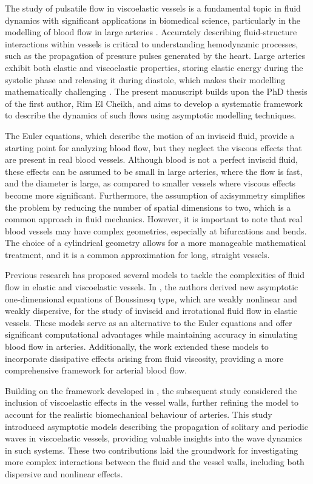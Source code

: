 \documentclass[alpha-refs, 12pt]{wiley-article}
\begin{document}
The study of pulsatile flow in viscoelastic vessels is a fundamental topic in fluid dynamics with significant applications in biomedical science, particularly in the modelling of blood flow in large arteries \cite{Fung1997a}. Accurately describing fluid-structure interactions within vessels is critical to understanding hemodynamic processes, such as the propagation of pressure pulses generated by the heart. Large arteries exhibit both elastic and viscoelastic properties, storing elastic energy during the systolic phase and releasing it during diastole, which makes their modelling mathematically challenging \cite{Chandran2012, Quarteroni2004, VandeVosse2011}. The present manuscript builds upon the PhD thesis of the first author, Rim El Cheikh, and aims to develop a systematic framework to describe the dynamics of such flows using asymptotic modelling techniques.

The Euler equations, which describe the motion of an inviscid fluid, provide a starting point for analyzing blood flow, but they neglect the viscous effects that are present in real blood vessels. Although blood is not a perfect inviscid fluid, these effects can be assumed to be small in large arteries, where the flow is fast, and the diameter is large, as compared to smaller vessels where viscous effects become more significant. Furthermore, the assumption of axisymmetry simplifies the problem by reducing the number of spatial dimensions to two, which is a common approach in fluid mechanics. However, it is important to note that real blood vessels may have complex geometries, especially at bifurcations and bends. The choice of a cylindrical geometry allows for a more manageable mathematical treatment, and it is a common approximation for long, straight vessels.

Previous research has proposed several models to tackle the complexities of fluid flow in elastic and viscoelastic vessels. In \cite{Mitsotakis2018}, the authors derived new asymptotic one-dimensional equations of Boussinesq type, which are weakly nonlinear and weakly dispersive, for the study of inviscid and irrotational fluid flow in elastic vessels. These models serve as an alternative to the Euler equations and offer significant computational advantages while maintaining accuracy in simulating blood flow in arteries. Additionally, the work extended these models to incorporate dissipative effects arising from fluid viscosity, providing a more comprehensive framework for arterial blood flow.

Building on the framework developed in \cite{Mitsotakis2018}, the subsequent study \cite{Mitsotakis2019} considered the inclusion of viscoelastic effects in the vessel walls, further refining the model to account for the realistic biomechanical behaviour of arteries. This study introduced asymptotic models describing the propagation of solitary and periodic waves in viscoelastic vessels, providing valuable insights into the wave dynamics in such systems. These two contributions laid the groundwork for investigating more complex interactions between the fluid and the vessel walls, including both dispersive and nonlinear effects.
\end{document}
